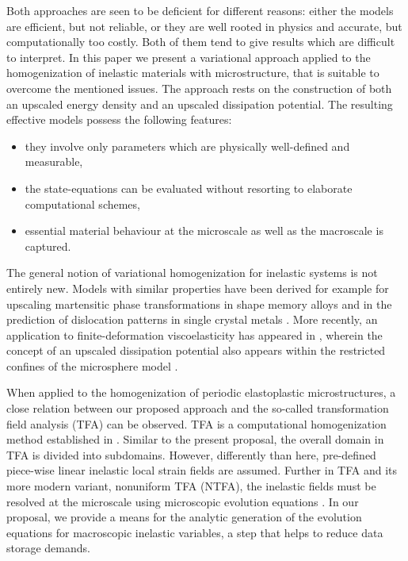 \documentclass[final,1p,times]{elsarticle}
\begin{document}
Both approaches are seen to be deficient for different reasons: either the models are efficient, but not reliable, or they are well rooted in physics and accurate, but computationally too costly. Both of them tend to give results which are difficult to interpret. 
In this paper we present a variational approach applied to the homogenization of inelastic materials with microstructure, that is suitable to overcome the mentioned issues.  The approach rests on the construction of both an upscaled energy density and an upscaled dissipation potential.  The resulting effective models possess the following features:
\begin{itemize}
	\item they involve only parameters which are physically well-defined and measurable,
	\item the state-equations can be evaluated without resorting to elaborate computational schemes,
	\item essential material behaviour at the microscale as well as the macroscale is captured.
\end{itemize}
The general notion of variational homogenization for inelastic systems is not entirely new.
Models with similar properties have been derived for example for upscaling martensitic phase transformations in shape memory alloys \citep{govindjee2007upper,hackl2008micromechanical,junker2011finite,junker2014thermo,WAIMANN2016110} and  in the prediction of dislocation patterns in single crystal metals \citep{kochmann2011evolution,hackl2012zamm,gunther2015variational,Aubry20032823,ContiDolzmannKlust2009,ContiOrtiz05,miehe2010,
	miehe2011a,miehe2003,miehe2004}. More recently, an application to finite-deformation viscoelasticity has appeared in \cite{govindjee2019fully}, wherein the concept of an upscaled dissipation potential also appears within the restricted confines of the microsphere model \citep{miehe.ea:04}.

When applied to the homogenization of periodic elastoplastic microstructures, a close relation between our proposed approach and the so-called
transformation field analysis {(TFA)} can be observed. TFA is a computational homogenization method established in \cite{Dvorak1992,DvorakBenveniste1992}. Similar to the present proposal, the overall domain in TFA is divided into subdomains. However, differently than here, pre-defined piece-wise linear inelastic local strain fields are assumed.  Further in TFA and its more modern variant, nonuniform TFA (NTFA), the inelastic fields must be resolved at the microscale using microscopic evolution equations \citep{MichelSuquet2003,FRITZEN2015114}.  In our proposal, we provide a means for the analytic generation of the evolution equations for macroscopic inelastic variables, a step that helps to reduce data storage demands.
\end{document}
